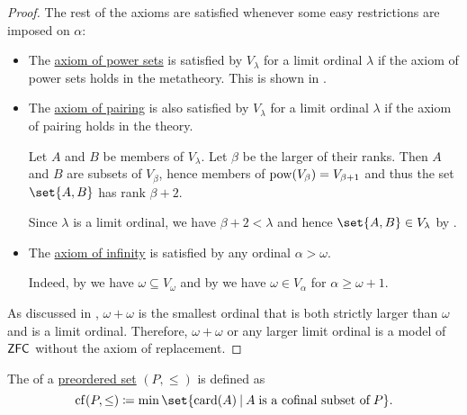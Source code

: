 \begin{proof}
  The rest of the axioms are satisfied whenever some easy restrictions are imposed on \( \alpha \):
  \begin{itemize}
    \item The \hyperref[def:zfc/power_set]{axiom of power sets} is satisfied by \( V_\lambda \) for a limit ordinal \( \lambda \) if the axiom of power sets holds in the metatheory. This is shown in .

    \item The \hyperref[def:zfc/pairing]{axiom of pairing} is also satisfied by \( V_\lambda \) for a limit ordinal \( \lambda \) if the axiom of pairing holds in the theory.

    Let \( A \) and \( B \) be members of \( V_\lambda \). Let \( \beta \) be the larger of their ranks. Then \( A \) and \( B \) are subsets of \( V_\beta \), hence members of \( \operatorname{pow}(V_\beta) = V_{\beta + 1} \) and thus the set \( \set{ A, B } \) has rank \( \beta + 2 \).

    Since \( \lambda \) is a limit ordinal, we have \( \beta + 2 < \lambda \) and hence \( \set{ A, B } \in V_\lambda \) by .

    \item The \hyperref[def:zfc/infinity]{axiom of infinity} is satisfied by any ordinal \( \alpha > \omega \).

    Indeed, by  we have \( \omega \subseteq V_\omega \) and by  we have \( \omega \in V_\alpha \) for \( \alpha \geq \omega + 1 \).
  \end{itemize}

  As discussed in , \( \omega + \omega \) is the smallest ordinal that is both strictly larger than \( \omega \) and is a limit ordinal. Therefore, \( \omega + \omega \) or any larger limit ordinal is a model of \( \textsf{ZFC} \) without the axiom of replacement.
\end{proof}

\begin{definition}\label{def:cofinality}
  The  of a \hyperref[def:preordered_set]{preordered set} \( (P, \leq) \) is defined as
  \begin{equation*}
    \op{cf}(P, \leq) \coloneqq \min\set{ \card(A) \given A \T{is a cofinal subset of} P }.
  \end{equation*}
\end{definition}

